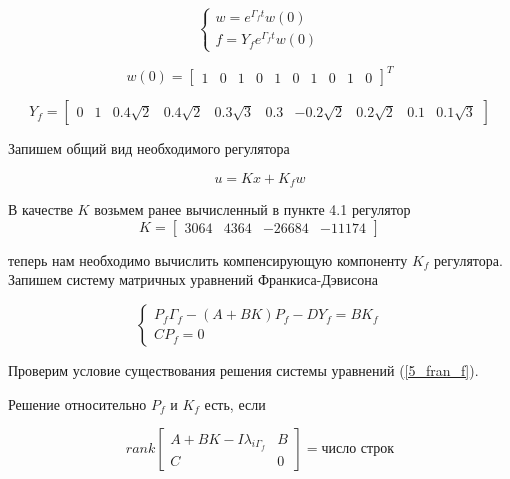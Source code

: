 \begin{equation}
\begin{cases}
    w = e^{\Gamma_f t} w(0)\\
    f = Y_f e^{\Gamma_f t} w(0)
\end{cases}
\end{equation}

\begin{equation}
    w(0) = \begin{bmatrix}
       1 &  0 & 1 & 0 & 1 & 0 & 1 & 0 & 1 & 0
    \end{bmatrix}^T
\end{equation}

\begin{equation}
    Y_f = \begin{bmatrix}
        0 & 1 & 0.4\sqrt{2} & 0.4\sqrt{2} & 0.3\sqrt{3} & 0.3 & -0.2 \sqrt{2} & 0.2 \sqrt{2} & 0.1 & 0.1 \sqrt{3}
    \end{bmatrix}
\end{equation}

Запишем общий вид необходимого регулятора

\begin{equation}
    u = Kx + K_f w
\end{equation}

В качестве $K$ возьмем ранее вычисленный в пункте 4.1 регулятор 
\begin{equation}
    K = \begin{bmatrix}
        3064 & 4364 & -26684 & -11174
    \end{bmatrix}
\end{equation}

теперь нам необходимо вычислить компенсирующую компоненту $K_f$ регулятора. Запишем систему матричных уравнений Франкиса-Дэвисона

\begin{equation}
\label{5_fran_f}
    \begin{cases}
       P_f \Gamma_f - (A+BK)P_f-DY_f=BK_f\\
       CP_f = 0
    \end{cases}
\end{equation}

Проверим условие существования решения системы уравнений (\ref{5_fran_f}).

Решение относительно $P_f$ и $K_f$ есть, если

\begin{equation}
\label{5_f_rule}
    rank \begin{bmatrix}
        A+BK-I\lambda_{i\Gamma_f}&B\\
        C & 0
    \end{bmatrix} = \text{число строк}
\end{equation}

